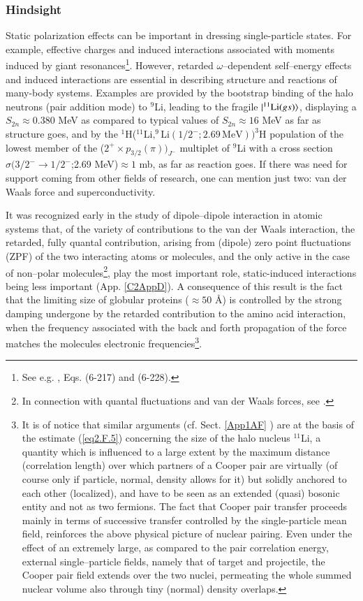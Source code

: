 \subsubsection{Hindsight}
Static polarization effects can be important in dressing single-particle states. For example, effective charges  and induced interactions associated with moments induced by giant resonances\footnote{See e.g. \cite{Bohr:75}, Eqs. (6-217) and (6-228).}. However, retarded $\omega$--dependent self--energy effects and induced interactions are essential in describing structure and reactions of many-body systems. Examples are provided by the bootstrap binding of the halo neutrons (pair addition mode) to $^9$Li, leading to the fragile $|{^{11}\text{Li}(gs)} \rangle$, displaying a $S_{2n}\approx0.380$ MeV as compared to typical values of $S_{2n}\approx16$ MeV as far as structure goes, and by the $^1$H($^{11}\text{Li},^9\text{Li}(1/2^-;2.69\,\text{MeV}))^3$H population of the lowest member of the ($2^+\times p_{3/2}(\pi))_{J^-}$ multiplet of $^9$Li with a cross section $\sigma(3/2^-\to1/2^-$;2.69 MeV)$\approx 1$ mb, as far as reaction goes.
If there was need for support coming from other fields of research, one can mention just two: van der Waals force and superconductivity.


It was recognized early in the study of dipole--dipole interaction in atomic systems that, of the variety of contributions to the van der Waals interaction, the retarded, fully quantal contribution, arising from (dipole) zero point fluctuations (ZPF) of the two interacting atoms or molecules, and the only active  in the case of non--polar molecules\footnote{In connection with quantal fluctuations and van der Waals forces, see \cite{London:37}.}, play the most important role, static-induced interactions being less important (App. \ref{C2AppD}). A consequence of this result is the fact that the limiting size of globular proteins ($\approx 50$ \AA) is controlled by the strong damping undergone by the retarded contribution to the amino acid interaction, when the frequency associated with the  back and forth propagation of the force  matches the molecules electronic frequencies\footnote{It is of notice that similar arguments (cf. Sect. \ref{App1AF} ) are at the basis of the estimate (\ref{eq2.F.5}) concerning the size of the halo nucleus $^{11}$Li, a quantity which is influenced to a large extent by the maximum distance (correlation length) over which  partners of a Cooper pair are virtually (of course only if particle, normal, density allows for it) but solidly anchored to each other (localized), and have to be seen as an extended (quasi) bosonic entity and not as two fermions. The fact that Cooper pair transfer proceeds mainly in terms of successive transfer controlled by the single-particle mean field, reinforces the above physical picture of nuclear pairing. Even under the effect of an extremely large, as compared to the pair correlation energy, external single--particle fields, namely that of target and projectile, the Cooper pair field extends over the two nuclei, permeating the whole summed nuclear volume also through  tiny (normal) density overlaps.}.


